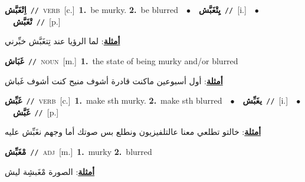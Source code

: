 \documentclass[10pt,a4paper,twoside]{article} %
\begin{document}
\begin{multicols}{2}
{{{\setlength\topsep{0pt}\textbf{\foreignlanguage{arabic}{اِتْغَبَّش}}\ {\color{gray}\texttt{//}\color{black}}\ \textsc{verb}\ [c.]\ \textbf{1.}~be murky.  \textbf{2.}~be blurred\ \ $\bullet$\ \ \setlength\topsep{0pt}\textbf{\foreignlanguage{arabic}{يِتْغَبَّش}}\ {\color{gray}\texttt{//}\color{black}}\ [i.]\ \ $\bullet$\ \ \setlength\topsep{0pt}\textbf{\foreignlanguage{arabic}{تْغَبَّش}}\ {\color{gray}\texttt{//}\color{black}}\ [p.]\  \begin{flushright}\color{gray}\foreignlanguage{arabic}{\textbf{\underline{\foreignlanguage{arabic}{أمثلة}}}: لما الرؤيا عند تِتغَبَّش خبِّرني}\end{flushright}\color{black}} \vspace{2mm}

{\setlength\topsep{0pt}\textbf{\foreignlanguage{arabic}{غَبَاش}}\ {\color{gray}\texttt{//}\color{black}}\ \textsc{noun}\ [m.]\ \textbf{1.}~the state of being murky and/or blurred\  \begin{flushright}\color{gray}\foreignlanguage{arabic}{\textbf{\underline{\foreignlanguage{arabic}{أمثلة}}}: أول أسبوعين ماكنت قادرة أشوف منيح كنت أشوف غَباش}\end{flushright}\color{black}} \vspace{2mm}

{\setlength\topsep{0pt}\textbf{\foreignlanguage{arabic}{غَبِّش}}\ {\color{gray}\texttt{//}\color{black}}\ \textsc{verb}\ [c.]\ \textbf{1.}~make sth murky.  \textbf{2.}~make sth blurred\ \ $\bullet$\ \ \setlength\topsep{0pt}\textbf{\foreignlanguage{arabic}{يغَبِّش}}\ {\color{gray}\texttt{//}\color{black}}\ [i.]\ \ $\bullet$\ \ \setlength\topsep{0pt}\textbf{\foreignlanguage{arabic}{غَبَّش}}\ {\color{gray}\texttt{//}\color{black}}\ [p.]\  \begin{flushright}\color{gray}\foreignlanguage{arabic}{\textbf{\underline{\foreignlanguage{arabic}{أمثلة}}}: خالتو تطلعي معنا عالتلفيزيون ونطلع بس صوتك أما وجهم نغَبِّش عليه}\end{flushright}\color{black}} \vspace{2mm}

{\setlength\topsep{0pt}\textbf{\foreignlanguage{arabic}{مْغَبِّش}}\ {\color{gray}\texttt{//}\color{black}}\ \textsc{adj}\ [m.]\ \textbf{1.}~murky  \textbf{2.}~blurred\  \begin{flushright}\color{gray}\foreignlanguage{arabic}{\textbf{\underline{\foreignlanguage{arabic}{أمثلة}}}: الصورة مْغَبشِة ليش}\end{flushright}\color{black}} \vspace{2mm}

}}
\end{multicols}
\end{document}
